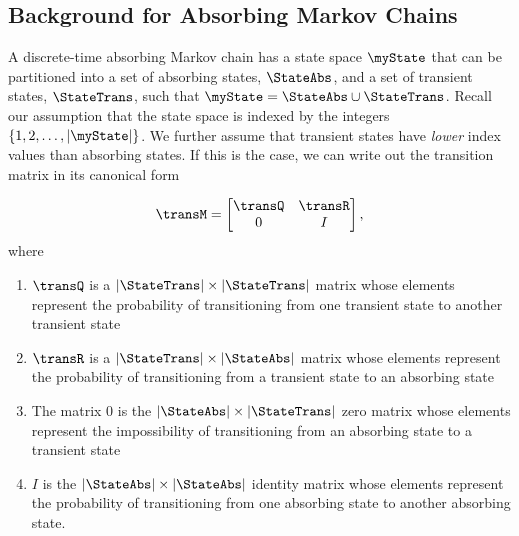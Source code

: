 \subsection{Background for Absorbing Markov Chains}

A discrete-time absorbing Markov chain has a state space $\myState$ that can be partitioned into a set of absorbing states, $\StateAbs$, and a set of transient states, $\StateTrans$, such that $\myState = \StateAbs \cup \StateTrans$.  Recall our assumption that the state space is indexed by the integers $\{1, 2, \ldots, |\myState|\}$.  We further assume that transient states have \emph{lower} index values than absorbing states.  If this is the case, we can write out the transition matrix in its canonical form 

\begin{equation}
	\label{eq:transM}
	\transM = 
	\begin{bmatrix}
		\transQ & \transR \\ 
		0 & I
	\end{bmatrix},
\end{equation}
%
where
\begin{enumerate}
	\item $\transQ$ is a $|\StateTrans| \times |\StateTrans|$ matrix whose elements represent the probability of transitioning from one transient state to another transient state
	\item $\transR$ is a $|\StateTrans| \times |\StateAbs|$ matrix whose elements represent the probability of transitioning from a transient state to an absorbing state
	\item The matrix $0$ is the $|\StateAbs| \times |\StateTrans|$ zero matrix whose elements represent the impossibility of transitioning from an absorbing state to a transient state
	\item $I$ is the $|\StateAbs| \times |\StateAbs|$ identity matrix whose elements represent the probability of transitioning from one absorbing state to another absorbing state.
\end{enumerate}

